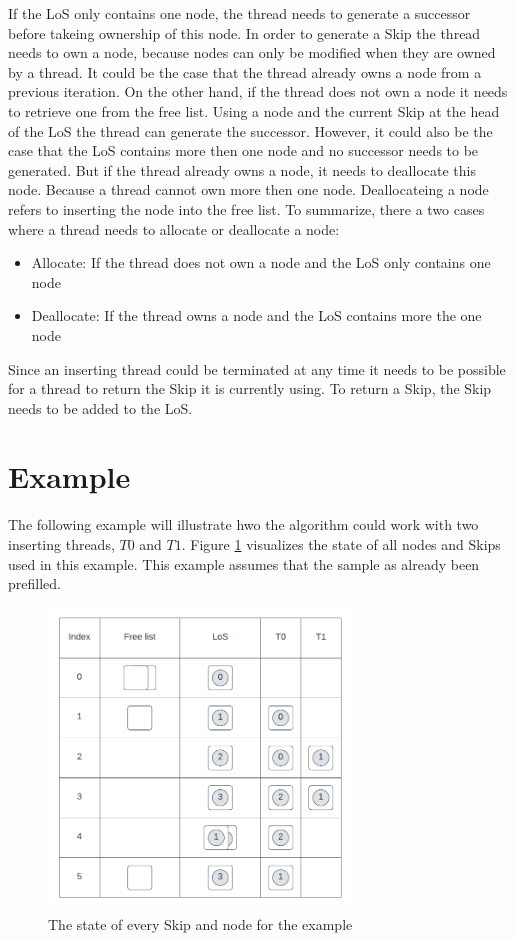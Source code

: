 \documentclass[sigconf,nonacm]{acmart}
\begin{document}
        If the LoS only contains one node, the thread needs to generate a successor before takeing ownership of this node. In order to generate a Skip the thread needs to own a node, because nodes can only be modified when they are owned by a thread. It could be the case that the thread already owns a node from a previous iteration. On the other hand, if the thread does not own a node it needs to retrieve one from the free list. Using a node and the current Skip at the head of the LoS the thread can generate the successor. However, it could also be the case that the LoS contains more then one node and no successor needs to be generated. But if the thread already owns a node, it needs to deallocate this node. Because a thread cannot own more then one node. Deallocateing a node refers to inserting the node into the free list. To summarize, there a two cases where a thread needs to allocate or deallocate a node: 
        \begin{itemize}
            \item Allocate: If the thread does not own a node and the LoS only contains one node
            \item Deallocate: If the thread owns a node and the LoS contains more the one node
        \end{itemize}

        Since an inserting thread could be terminated at any time it needs to be possible for a thread to return the Skip it is currently using. To return a Skip, the Skip needs to be added to the LoS.
        
    \section{Example}
        The following example will illustrate hwo the algorithm could work with two inserting threads, $T0$ and $T1$. Figure \ref{fig:example} visualizes the state of all nodes and Skips used in this example. This example assumes that the sample as already been prefilled.
        \begin{figure}[h]
            \includegraphics[height=8cm]{figure6.pdf}
            \caption{The state of every Skip and node for the example}
            \label{fig:example}
        \end{figure}
\end{document}

